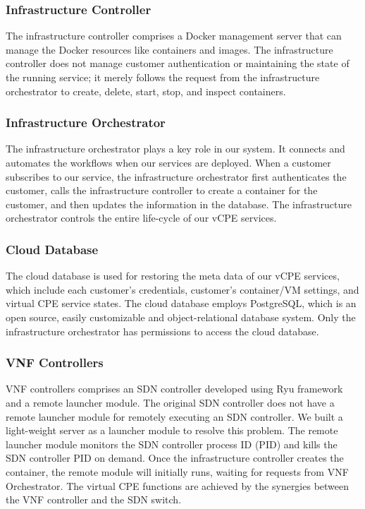 \subsubsection{Infrastructure Controller}
The infrastructure controller comprises a Docker management server that can manage the Docker resources like containers and images. The infrastructure controller does not manage customer authentication or maintaining the state of the running service; it merely follows the request from the infrastructure orchestrator to create, delete, start, stop, and inspect containers.

\subsubsection{Infrastructure Orchestrator}
The infrastructure orchestrator plays a key role in our system. It connects and automates the workflows when our services are deployed. When a customer subscribes to our service, the infrastructure orchestrator first authenticates the customer, calls the infrastructure controller to create a container for the customer, and then updates the information in the database. The infrastructure orchestrator controls the entire life-cycle of our vCPE services.

\subsubsection{Cloud Database}
The cloud database is used for restoring the meta data of our vCPE services, which include each customer’s credentials, customer’s container/VM settings, and virtual CPE service states. The cloud database employs PostgreSQL, which is an open source, easily customizable and object-relational database system. Only the infrastructure orchestrator has permissions to access the cloud database.

\subsubsection{VNF Controllers}
VNF controllers comprises an SDN controller developed using Ryu framework \cite{ryu} and a remote launcher module. The original SDN controller does not have a remote launcher module for remotely executing an SDN controller. We built a light-weight server as a launcher module to resolve this problem. The remote launcher module monitors the SDN controller process ID (PID) and kills the SDN controller PID on demand. Once the infrastructure controller  creates the container, the remote module will initially runs, waiting for requests from VNF Orchestrator. The virtual CPE functions are achieved by the synergies between the VNF controller and the SDN switch.

